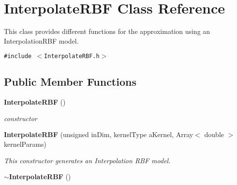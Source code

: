 \section{Interpolate\-RBF Class Reference}
\label{classInterpolateRBF}
This class provides different functions for the approximation using an Interpolation\-RBF model.  


{\tt \#include $<$Interpolate\-RBF.h$>$}

\subsection*{Public Member Functions}
\begin{CompactItemize}
\item 
{\bf Interpolate\-RBF} ()\label{classInterpolateRBF_a0}

\begin{CompactList}\small\item\em constructor \item\end{CompactList}\item 
{\bf Interpolate\-RBF} (unsigned in\-Dim, kernel\-Type a\-Kernel, Array$<$ double $>$ kernel\-Params)
\begin{CompactList}\small\item\em This constructor generates an Interpolation RBF model. \item\end{CompactList}\item 
{\bf $\sim$Interpolate\-RBF} ()\label{classInterpolateRBF_a2}


\end{CompactItemize}
